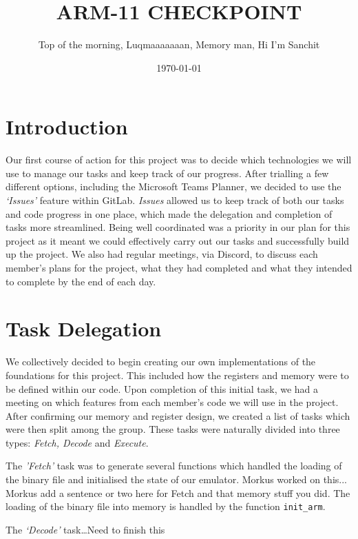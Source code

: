 \documentclass[10pt]{article}
\begin{document}
\title{ARM-11 CHECKPOINT}

\author{Top of the morning, Luqmaaaaaaan, Memory man, Hi I'm Sanchit}

\date{\today}

\maketitle

\section*{Introduction}
Our first course of action for this project was to decide which technologies we will use to manage our tasks
and keep track of our progress. After trialling a few different options, including the Microsoft Teams Planner,
we decided to use the \textsl{‘Issues’} feature within GitLab. \textsl{Issues} allowed us to keep track of both our tasks and code
progress in one place, which made the delegation and completion of tasks more streamlined. Being well coordinated was a priority in our plan for this project as it meant we could effectively carry out our tasks and successfully build up the project. We also had regular meetings, via Discord, to discuss each member’s plans
for the project, what they had completed and what they intended to complete by the end of each day. 


\section*{Task Delegation}
We collectively decided to begin creating our own implementations of the foundations for this project. This
included how the registers and memory were to be defined within our code. Upon completion of this initial
task, we had a meeting on which features from each member’s code we will use in the project. After
confirming our memory and register design, we created a list of tasks which were then split among the group.
These tasks were naturally divided into three types: \textsl{Fetch, Decode} and \textsl{Execute}.


The \textsl{'Fetch'} task was to generate several functions which handled the loading of the binary file and initialised
the state of our emulator. Morkus worked on this...
Morkus add a sentence or two here for Fetch and that memory stuff you did. 
The loading of the binary file into memory is handled by the function {\tt init\_arm}.


The \textsl{‘Decode’} task…Need to finish this
\end{document}
